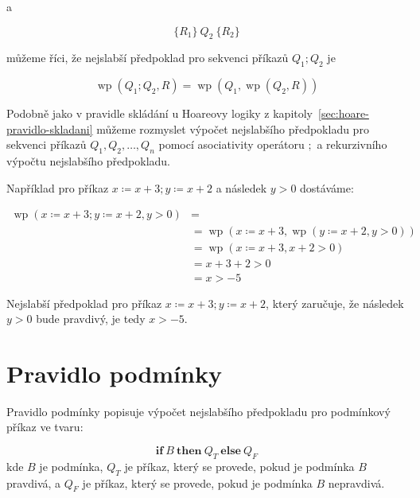 a

\begin{equation*}
    \{ R_1 \} \  Q_2 \  \{ R_2 \}
\end{equation*}

můžeme říci, že nejslabší předpoklad pro sekvenci příkazů $Q_1; Q_2$ je

\begin{equation*}
    \operatorname{wp}(Q_1; Q_2, R) = \operatorname{wp}(Q_1, \operatorname{wp}(Q_2, R))
\end{equation*}

Podobně jako v pravidle skládání u Hoareovy logiky z kapitoly~\ref{sec:hoare-pravidlo-skladani}
můžeme rozmyslet výpočet nejslabšího předpokladu pro sekvenci příkazů $Q_1, Q_2, \ldots, Q_n$
pomocí asociativity operátoru $;$ a rekurzivního výpočtu nejslabšího předpokladu.

Například pro příkaz $x \coloneqq x + 3; y \coloneqq x + 2$ a následek $y > 0$ dostáváme:

\begin{align*}
    \operatorname{wp}(x \coloneqq x + 3; y \coloneqq x + 2, y > 0) & = \\
                                                     & = \operatorname{wp}(x \coloneqq x + 3, \operatorname{wp}(y \coloneqq x + 2, y > 0)) \\
                                                     & = \operatorname{wp}(x \coloneqq x + 3, x + 2 > 0) \\
                                                     & = x + 3 + 2 > 0 \\
                                                     & = x > -5
\end{align*}

Nejslabší předpoklad pro příkaz $x \coloneqq x + 3; y \coloneqq x + 2$, který zaručuje, že
následek $y > 0$ bude pravdivý, je tedy $x > -5$.

\section{Pravidlo podmínky}
\label{sec:pravidlo-podminky}

Pravidlo podmínky popisuje výpočet nejslabšího předpokladu pro podmínkový příkaz ve tvaru:

\begin{equation*}
    \textbf{if} \ B \ \textbf{then} \ Q_T \ \textbf{else} \ Q_F
\end{equation*}
kde $B$ je podmínka, $Q_T$ je příkaz, který se provede, pokud je podmínka $B$ pravdivá,
a $Q_F$ je příkaz, který se provede, pokud je podmínka $B$ nepravdivá.

